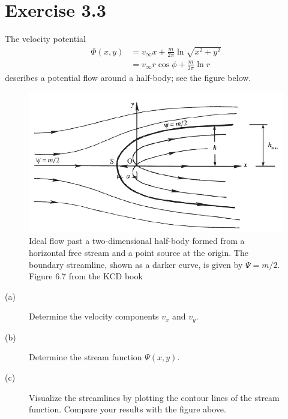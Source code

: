 \documentclass[a4paper, 10pt]{article}
\begin{document}
\section*{Exercise 3.3}
The velocity potential
\begin{align}
\Phi(x,y) &= v_\infty x + \frac{m}{2\pi}\ln\sqrt{x^2+y^2}\\
&= v_\infty r\cos\phi+\frac{m}{2\pi}\ln r
\end{align}
describes a potential flow around a half-body; see the figure below.
\begin{figure}[h!]
	\centering
	\includegraphics[width=.7\textwidth]{kcd2}
	\caption{Ideal flow past a two-dimensional half-body formed from a horizontal free stream and a point source at the origin. The boundary streamline, shown as a darker curve, is given by $\Psi=m/2$. Figure 6.7 from the KCD book}
\end{figure}

\begin{description}
	\item[(a)]
	Determine the velocity components $v_x$ and $v_y$.
	\item[(b)]
	Determine the stream function $\Psi(x,y)$.
	\item[(c)]
	Visualize the streamlines by plotting the contour lines of the stream function. Compare your results with the figure above.
\end{description}
\end{document}
